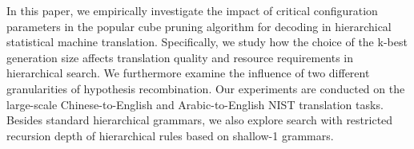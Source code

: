 In this paper, we empirically investigate the impact of critical configuration parameters in the popular cube pruning algorithm for decoding in hierarchical
 statistical machine translation. Specifically, we study how the choice of the
 k-best generation size affects translation quality and resource requirements
 in hierarchical search. We furthermore examine the influence of two different
 granularities of hypothesis recombination. Our experiments are conducted on the
 large-scale Chinese-to-English and Arabic-to-English NIST translation
 tasks. Besides standard hierarchical grammars, we also explore search with
 restricted recursion depth of hierarchical rules based on shallow-1 grammars.

